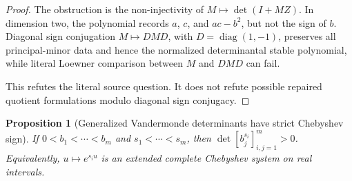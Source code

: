 \documentclass[11pt]{article}
\numberwithin{equation}{section}
\newtheorem{proposition}[theorem]{Proposition}
\theoremstyle{definition}
\theoremstyle{remark}
\newcommand{\1}{\mathbf 1}
\begin{document}
\begin{proof}
The obstruction is the non-injectivity of \(M\mapsto\det(I+MZ)\). In dimension two, the polynomial records \(a\), \(c\), and \(ac-b^2\), but not the sign of \(b\). Diagonal sign conjugation \(M\mapsto DMD\), with \(D=\operatorname{diag}(1,-1)\), preserves all principal-minor data and hence the normalized determinantal stable polynomial, while literal Loewner comparison between \(M\) and \(DMD\) can fail.

This refutes the literal source question. It does not refute possible repaired quotient formulations modulo diagonal sign conjugacy.
\end{proof}

\begin{proposition}[Generalized Vandermonde determinants have strict Chebyshev sign]
\label{res:generalized-vandermonde-chebyshev-strictsign}
If \(0<b_1<\cdots<b_m\) and \(s_1<\cdots<s_m\), then \(\det[b_j^{s_i}]_{i,j=1}^m>0\). Equivalently, \(u\mapsto e^{s_i u}\) is an extended complete Chebyshev system on real intervals.
\end{proposition}
\end{document}
